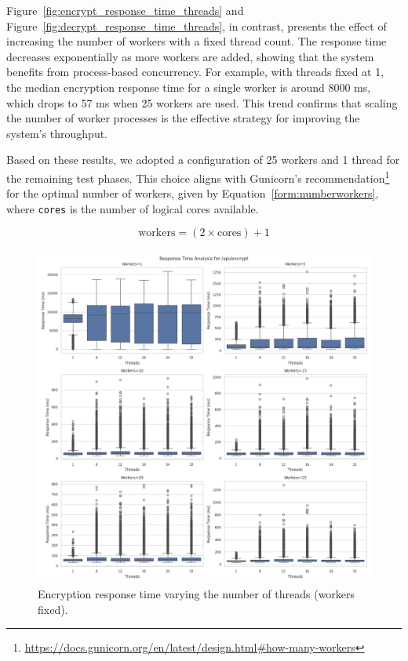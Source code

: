 \documentclass[cic,tc,english]{iiufrgs}
\numberwithin{algorithm}{chapter}
\begin{document}
        Figure~\ref{fig:encrypt_response_time_threads} and Figure~\ref{fig:decrypt_response_time_threads}, in contrast, presents the effect of increasing the number of workers with a fixed thread count. The response time decreases exponentially as more workers are added, showing that the system benefits from process-based concurrency. For example, with threads fixed at 1, the median encryption response time for a single worker is around 8000 ms, which drops to 57 ms when 25 workers are used. This trend confirms that scaling the number of worker processes is the effective strategy for improving the system's throughput.

        Based on these results, we adopted a configuration of 25 workers and 1 thread for the remaining test phases. This choice aligns with Gunicorn's recommendation\footnote{\url{https://docs.gunicorn.org/en/latest/design.html\#how-many-workers}} for the optimal number of workers, given by Equation~\ref{form:numberworkers}, where \texttt{cores} is the number of logical cores available.

        \begin{equation}
            \label{form:numberworkers}
            \text{workers} = (2 \times \text{cores}) + 1
        \end{equation}

        \begin{figure}
            \centering
            \includegraphics[width=\textwidth]{images/phase1/api_encrypt/response_time_workers_summary.png}
            \caption{Encryption response time varying the number of threads (workers fixed).}
            \label{fig:encrypt_response_time_workers}
        \end{figure}
\end{document}
